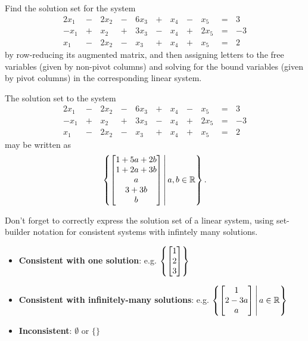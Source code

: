 \begin{activity}{10}
Find the solution set for the system
\begin{alignat*}{6}
2x_1&\,-\,&2x_2&\,-\,&6x_3&\,+\,&x_4&\,-\,&x_5&\,=\,&3 \\
-x_1&\,+\,&x_2&\,+\,&3x_3&\,-\,&x_4&\,+\,&2x_5 &\,=\,& -3 \\
x_1&\,-\,&2x_2&\,-\,&x_3&\,+\,&x_4&\,+\,&x_5 &\,=\,& 2
\end{alignat*}
by row-reducing its augmented matrix, and then
assigning letters to the free variables (given by non-pivot columns)
and solving for the bound variables (given by pivot columns) in
the corresponding linear system.
\end{activity}

\begin{observation}
The solution set to the system
\begin{alignat*}{6}
2x_1&\,-\,&2x_2&\,-\,&6x_3&\,+\,&x_4&\,-\,&x_5&\,=\,&3 \\
-x_1&\,+\,&x_2&\,+\,&3x_3&\,-\,&x_4&\,+\,&2x_5 &\,=\,& -3 \\
x_1&\,-\,&2x_2&\,-\,&x_3&\,+\,&x_4&\,+\,&x_5 &\,=\,& 2
\end{alignat*}
may be written as
\[
  \left\{
    \begin{bmatrix}
      1+5a+2b \\
      1+2a+3b \\
      a \\
      3+3b \\
      b
    \end{bmatrix}
  \,\middle|\,
    a,b\in \mathbb{R}
  \right\}
.\]
\end{observation}

\begin{remark}
Don't forget to correctly express the solution set of a linear system,
using set-builder notation for consistent systems with
infintely many solutions.
  \begin{itemize}
  \item \textbf{Consistent with one solution}: e.g.
        \(\left\{ \begin{bmatrix}1\\2\\3\end{bmatrix} \right\}\)
  \item \textbf{Consistent with infinitely-many solutions}: e.g.
        \(
          \left\{
            \begin{bmatrix}1\\2-3a\\a\end{bmatrix}
          \,\middle|\,
            a\in\mathbb{R}
          \right\}
        \)
  \item \textbf{Inconsistent}: \(\emptyset\) or \(\{\}\)
  \end{itemize}
\end{remark}

